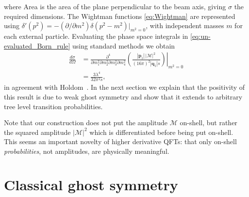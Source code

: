 \documentclass[pra,aps,amsmath,amssymb,notitlepage, twocolumn,superscriptaddress,longbibliography,nofootinbib,floatfix,10pt]{revtex4-2}
\begin{document}
where Area is the area of the plane perpendicular to the beam axis, giving $\sigma$ the required dimensions. The Wightman functions \eqref{eq:Wightman} are represented using $\delta'(p^2)=-(\partial/\partial m^2) \delta(p^2-m^2)|_{m^2=0}$, with independent masses $m$ for each external particle. Evaluating the phase space integrals in \eqref{eq:un-evaluated_Born_rule} using standard methods we obtain 
\begin{align}\label{eq:dipole_cross_section}
	\frac{d\sigma}{d\Omega} &= \frac{\partial^4}{\partial m_1^2 \partial m_2^2 \partial m_3^2 \partial m_4^2}\left.\left(\frac{|\mathbf{p}_1|\, \left| \mathcal{M}\right|^2}{(16\pi)^2|\mathbf{q}_1|s} \right)\right|_{m^2=0} \nonumber\\
    &= \frac{3\lambda^4}{32\pi^2s},
\end{align}
in agreement with Holdom~\cite{Holdom:2024cfq}. In the next section we explain that the positivity of this result is due to weak ghost symmetry and show that it extends to arbitrary tree level transition probabilities.

Note that our construction does not put the amplitude $\mathcal{M}$ on-shell, but rather the squared amplitude $|\mathcal{M}|^2$ which is differentiated before being put on-shell. This seems an important novelty of higher derivative QFTs: that only on-shell {\it probabilities}, not amplitudes, are physically meaningful.   
  

\section{Classical ghost symmetry}
\end{document}

